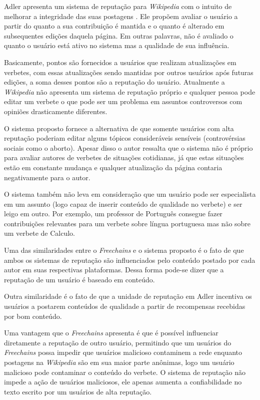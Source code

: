 \documentclass[12pt]{article}
\newcommand{\FC} {\emph{Freechains}\xspace}
\begin{document}
Adler apresenta um sistema de reputação para \emph{Wikipedia} com o intuito de melhorar a integridade das suas postagens \cite{adler2007content}. Ele propõem avaliar o usuário a partir do quanto a sua contribuição é mantida e o quanto é alterado em subsequentes edições daquela página. Em outras palavras, não é avaliado o quanto o usuário está ativo no sistema mas a qualidade de sua influência. 

Basicamente, pontos são fornecidos a usuários que realizam atualizações em verbetes, com essas atualizações sendo  mantidas por outros usuários após futuras edições, a soma desses pontos são a reputação do usuário. Atualmente a \emph{Wikipedia} não apresenta um sistema de reputação próprio e qualquer pessoa pode editar um verbete o que pode ser um problema em assuntos controversos com opiniões drasticamente diferentes.

O sistema proposto fornece a alternativa de que somente usuários com alta reputação poderiam editar alguns tópicos consideráveis sensíveis (controvérsias sociais como o aborto). Apesar disso o autor ressalta que o sistema não é próprio para avaliar autores de verbetes de situações cotidianas, já que estas situações estão em constante mudança e qualquer atualização da página contaria negativamente para o autor. 

O sistema também não leva em consideração que um usuário pode ser especialista em um assunto (logo capaz de inserir conteúdo de qualidade no verbete) e ser leigo em outro. Por exemplo, um professor de Português consegue fazer contribuições relevantes para um verbete sobre língua portuguesa mas não sobre um verbete de Calculo. 

Uma das similaridades entre o \FC e o sistema proposto é o fato de que ambos os sistemas de reputação são influenciados pelo conteúdo postado por cada autor em suas respectivas plataformas. Dessa forma pode-se dizer que a reputação de um usuário é baseado em conteúdo.

Outra similaridade é o fato de que a unidade de reputação em Adler incentiva os usuários a postarem conteúdos de qualidade a partir de recompensas recebidas por bom conteúdo.

Uma vantagem que o \FC apresenta é que é possível influenciar diretamente a reputação de outro usuário, permitindo que um usuários do \FC possa impedir que usuários malicioso contaminem a rede enquanto postagens na \emph{Wikipedia} são em sua maior parte anônimas, logo um usuário malicioso pode contaminar o conteúdo do verbete. O sistema de reputação não impede a ação de usuários maliciosos, ele apenas aumenta a confiabilidade no texto escrito por um usuários de alta reputação.
\end{document}
